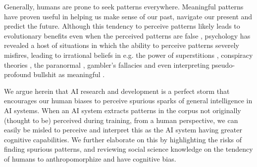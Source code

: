 \documentclass{article}
\theoremstyle{plain}
\theoremstyle{definition}
\theoremstyle{remark}
\begin{document}

Generally, humans are prone to seek patterns everywhere. Meaningful patterns have proven useful in helping us make sense of our past, navigate our present and predict the future. Although this tendency to perceive patterns likely leads to evolutionary benefits even when the perceived patterns are false \cite{foster2009evolution}, psychology has revealed a host of situations in which the ability to perceive patterns severely misfires, leading to irrational beliefs in e.g. the power of superstitions \cite{foster2009evolution}, conspiracy theories \cite{van2018connecting}, the paranormal \cite{muller2023linking}, gambler's fallacies \cite{ladouceur1996erroneous} and even interpreting pseudo-profound bullshit as meaningful \cite{walker2019finding}. 

We argue herein that AI research and development is a perfect storm that encourages our human biases to perceive spurious sparks of general intelligence in AI systems. When an AI system extracts patterns in the corpus not originally (thought to be) perceived during training, from a human perspective, we can easily be misled to perceive and interpret this as the AI system having greater cognitive capabilities. We further elaborate on this by highlighting the risks of finding spurious patterns, and reviewing social science knowledge on the tendency of humans to anthropomorphize and have cognitive bias.
\end{document}
